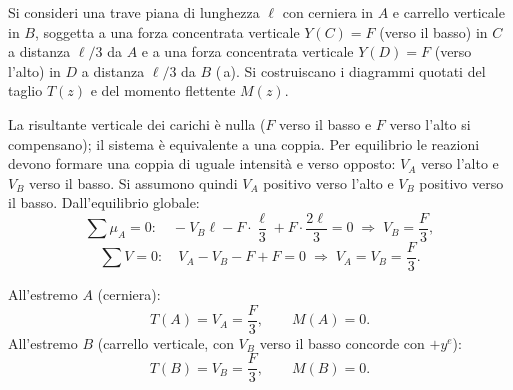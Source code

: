 \begin{esempio}
	Si consideri una trave piana di lunghezza $\ell$
	con cerniera in $A$ e carrello verticale in $B$,
	soggetta a una forza concentrata verticale
	$Y(C) = F$ (verso il basso) in $C$ a distanza
	$\ell/3$ da $A$ e a una forza concentrata
	verticale $Y(D) = F$ (verso l'alto) in $D$
	a distanza $\ell/3$ da $B$ (\,a).
	Si costruiscano i diagrammi quotati del taglio $T(z)$
	e del momento flettente $M(z)$.
	
	\begin{svolgimento}
		
		



		
		
		La risultante verticale dei carichi è nulla
		($F$ verso il basso e $F$ verso l'alto si
		compensano); il sistema è equivalente a una
		coppia. Per equilibrio le reazioni devono
		formare una coppia di uguale intensità e
		verso opposto: $V_A$ verso l'alto e $V_B$
		verso il basso.
		Si assumono quindi $V_A$ positivo verso
		l'alto e $V_B$ positivo verso il basso.
		Dall'equilibrio globale:
		\[
		\sum \mu_A = 0:\quad
		-V_B\ell - F\cdot\frac{\ell}{3}
		+ F\cdot\frac{2\ell}{3} = 0
		\;\Rightarrow\;
		V_B = \frac{F}{3},
		\]
		\[
		\sum V = 0:\quad
		V_A - V_B - F + F = 0
		\;\Rightarrow\;
		V_A = V_B = \frac{F}{3}.
		\]
		
		All'estremo $A$ (cerniera):
		\[
		T(A) = V_A = \frac{F}{3}, \qquad M(A) = 0.
		\]
		All'estremo $B$ (carrello verticale, con $V_B$
		verso il basso concorde con $+y^e$):
		\[
		T(B) = V_B = \frac{F}{3}, \qquad M(B) = 0.
		\]
		

\end{svolgimento}
\end{esempio}
